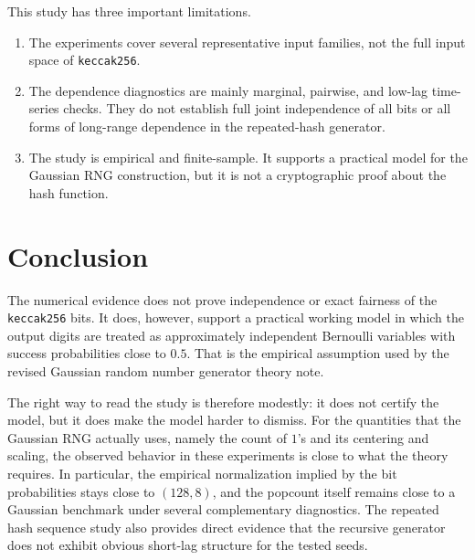 \documentclass[11pt]{article}
\begin{document}
This study has three important limitations.

\begin{enumerate}
\item The experiments cover several representative input families, not the full
input space of \texttt{keccak256}.
\item The dependence diagnostics are mainly marginal, pairwise, and low-lag
time-series checks. They do not establish full joint independence of all bits or
all forms of long-range dependence in the repeated-hash generator.
\item The study is empirical and finite-sample. It supports a practical model
for the Gaussian RNG construction, but it is not a cryptographic proof about the
hash function.
\end{enumerate}

\section{Conclusion}

The numerical evidence does not prove independence or exact fairness of the
\texttt{keccak256} bits. It does, however, support a practical working model in
which the output digits are treated as approximately independent Bernoulli
variables with success probabilities close to $0.5$. That is the empirical
assumption used by the revised Gaussian random number generator theory note.

The right way to read the study is therefore modestly: it does not certify the
model, but it does make the model harder to dismiss. For the quantities that the
Gaussian RNG actually uses, namely the count of $1$'s and its centering and
scaling, the observed behavior in these experiments is close to what the theory
requires. In particular, the empirical normalization implied by the bit
probabilities stays close to $(128, 8)$, and the popcount itself remains close
to a Gaussian benchmark under several complementary diagnostics. The repeated
hash sequence study also provides direct evidence that the recursive generator
does not exhibit obvious short-lag structure for the tested seeds.
\end{document}
